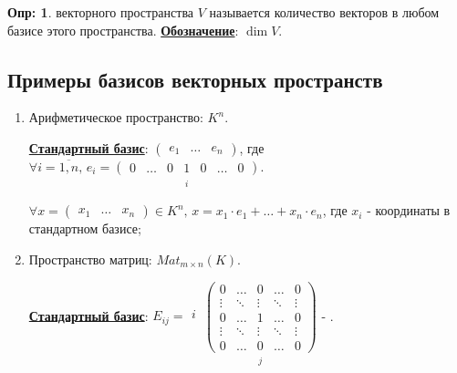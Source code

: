 \documentclass[12pt]{article}
\theoremstyle{definition}
\newtheorem{defn}{Опр:}
\newcommand{\mat}[2]{Mat_{#1\times #2}}
\begin{document}
\begin{defn}
	 векторного пространства $V$ называется количество векторов в любом базисе этого пространства. \textbf{\uline{Обозначение}}: $\dim{V}$.
\end{defn}

\subsection*{Примеры базисов векторных пространств}

\begin{enumerate}[label=(\arabic*)]
	\item Арифметическое пространство: $K^n$. 
	
	\textbf{\uline{Стандартный базис}}: $
		\begin{pmatrix}
			e_1 & \dotsc & e_n
		\end{pmatrix}$, где $\forall i = \overline{1,n}, \, e_i = \underset{
		\begin{matrix}
			&&&i&&&
		\end{matrix}}{
		\begin{pmatrix}
			0 & \dotsc & 0 & 1 & 0 & \dotsc & 0 
		\end{pmatrix}}$.
	
	$\forall x = \begin{pmatrix}
		x_1 & \dotsc & x_n
	\end{pmatrix} \in K^n, \, x = x_1{\cdot}e_1 + \dotsc + x_n{\cdot}e_n$, где $x_i$ - координаты в стандартном базисе;
	\item Пространство матриц: $\mat{m}{n}(K)$. 
	
	\textbf{\uline{Стандартный базис}}: $E_{ij} = 
	\begin{matrix}
		\\
		\\
		i\\
		\\
		\\
	\end{matrix}\,
	\underset{
	\begin{matrix}
		&&j&&
	\end{matrix}
	}{
	\begin{pmatrix}
		0 & \dotsc & 0 & \dotsc & 0\\
		\vdots & \ddots & \vdots & \ddots & \vdots \\
		0 & \dotsc & 1 & \dotsc & 0 \\
		\vdots & \ddots & \vdots & \ddots & \vdots \\
		0 & \dotsc & 0 & \dotsc & 0
	\end{pmatrix}
	}$ - .


\end{enumerate}
\end{document}
